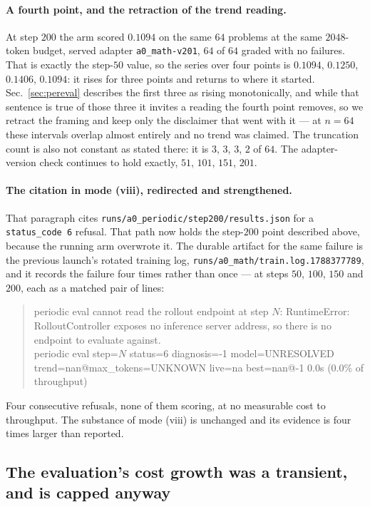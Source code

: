 \paragraph{A fourth point, and the retraction of the trend reading.} At step $200$ the arm
scored $0.1094$ on the same $64$ problems at the same $2048$-token budget, served adapter
\texttt{a0\_math-v201}, $64$ of $64$ graded with no failures. That is exactly the step-$50$
value, so the series over four points is $0.1094$, $0.1250$, $0.1406$, $0.1094$: it rises for
three points and returns to where it started. Sec.~\ref{sec:pereval} describes the first three
as rising monotonically, and while that sentence is true of those three it invites a reading
the fourth point removes, so we retract the framing and keep only the disclaimer that went with
it --- at $n=64$ these intervals overlap almost entirely and no trend was claimed. The
truncation count is also not constant as stated there: it is $3$, $3$, $3$, $2$ of $64$.
The adapter-version check continues to hold exactly, $51$, $101$, $151$, $201$.

\paragraph{The citation in mode (viii), redirected and strengthened.} That paragraph cites
\texttt{runs/a0\_periodic/step200/results.json} for a \texttt{status\_code 6} refusal. That
path now holds the step-$200$ point described above, because the running arm overwrote it. The
durable artifact for the same failure is the previous launch's rotated training log,
\texttt{runs/a0\_math/train.log.1788377789}, and it records the failure four times rather than
once --- at steps $50$, $100$, $150$ and $200$, each as a matched pair of lines:

\begin{quote}\small\ttfamily
periodic eval cannot read the rollout endpoint at step $N$: RuntimeError:
RolloutController exposes no inference server address, so there is no endpoint to
evaluate against.\\
periodic eval step=$N$ status=6 diagnosis=-1 model=UNRESOLVED trend=nan@max\_tokens=UNKNOWN
live=na best=nan@-1 0.0s (0.0\% of throughput)
\end{quote}

Four consecutive refusals, none of them scoring, at no measurable cost to throughput. The
substance of mode (viii) is unchanged and its evidence is four times larger than reported.

\subsection{The evaluation's cost growth was a transient, and is capped anyway}
\label{sec:evalcost}

